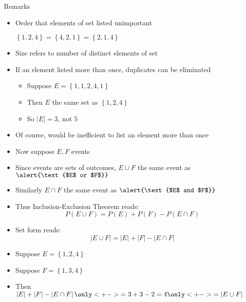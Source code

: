 \documentclass[handout]{beamer}
\theoremstyle{definition}
\begin{document}
\begin{frame}{Remarks}
\begin{itemize}
\item Order that elements \alert{of set} listed unimportant
\begin{example}
$\left\{1,2,4\right\}=\left\{4,2,1\right\}=\left\{2,1,4\right\}$
\end{example}
\item Size refers to number of \alert{distinct} elements
of set
\item If an element listed more than once, duplicates can be eliminated
\begin{example}
\begin{itemize}
\item Suppose $E=\left\{1,1,2,4,1\right\}$
\item Then $E$ the same set as $\left\{1,2,4\right\}$
\item So $\left|E\right|=3$, not $5$
\end{itemize}
\end{example}
\item Of course, would be inefficient to list
an element more than once
\end{itemize}
\end{frame}

\begin{frame}
\begin{itemize}
\item Now suppose $E,F$ events
\item Since events are sets of outcomes,
$E\cup F$ the same event as $\alert{\text{$E$ or $F$}}$
\item Similarly
$E\cap F$ the same event as $\alert{\text{$E$ and $F$}}$
\item Thus Inclusion-Exclusion Theorem reads:
\[P\left(E\cup F\right)=P\left(E\right)
+P\left(F\right)-P\left(E\cap F\right)\]
\item Set form reads:
\[\left|E\cup F\right|=\left|E\right|
+\left|F\right|-\left|E\cap F\right|\]
\end{itemize}
\begin{example}
\begin{itemize}
\item Suppose $E=\left\{1,2,4\right\}$
\item Suppose $F=\left\{1,3,4\right\}$
\item Then $\left|E\right|
+\left|F\right|-\left|E\cap F\right|
\only<+->{=3+3-2=4}
\only<+->{=\left|E\cup F\right|}$
\end{itemize}
\end{example}
\end{frame}
\end{document}
